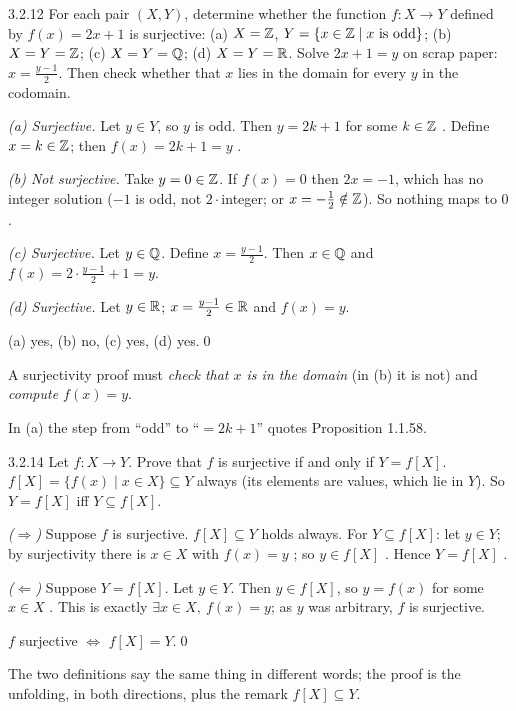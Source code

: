 \begin{bookex}[essential]{3.2.12}
For each pair $(X,Y)$, determine whether the function $f:X\to Y$ defined by $f(x)=2x+1$ is surjective: (a) $X=\mathbb{Z}$, $Y=\{x\in\mathbb{Z}\mid x\text{ is odd}\}$; (b) $X=Y=\mathbb{Z}$; (c) $X=Y=\mathbb{Q}$; (d) $X=Y=\mathbb{R}$.
\solution
\plan Solve $2x+1=y$ on scrap paper: $x=\frac{y-1}2$. Then check whether that $x$ lies in the domain for every $y$ in the codomain.
\begin{steps}
\item \emph{(a) Surjective.} Let $y\in Y$, so $y$ is odd. Then $y=2k+1$ for some $k\in\mathbb{Z}$ . Define $x=k\in\mathbb{Z}$; then $f(x)=2k+1=y$ .
\item \emph{(b) Not surjective.} Take $y=0\in\mathbb{Z}$. If $f(x)=0$ then $2x=-1$, which has no integer solution ($-1$ is odd, not $2\cdot$integer; or $x=-\frac12\notin\mathbb{Z}$). So nothing maps to $0$.
\item \emph{(c) Surjective.} Let $y\in\mathbb{Q}$. Define $x=\frac{y-1}2$. Then $x\in\mathbb{Q}$  and $f(x)=2\cdot\frac{y-1}2+1=y$.
\item \emph{(d) Surjective.} Let $y\in\mathbb{R}$; $x=\frac{y-1}2\in\mathbb{R}$ and $f(x)=y$.
\end{steps}
\conclusion (a) yes, (b) no, (c) yes, (d) yes.\qed
\begin{compare}
\item A surjectivity proof must \emph{check that $x$ is in the domain} (in (b) it is not) and \emph{compute $f(x)=y$}.
\item In (a) the step from ``odd'' to ``$=2k+1$'' quotes Proposition 1.1.58.
\end{compare}
\end{bookex}

\begin{bookex}[essential]{3.2.14}
Let $f:X\to Y$. Prove that $f$ is surjective if and only if $Y=f[X]$.
\solution
\given $f[X]=\{f(x)\mid x\in X\}\subseteq Y$ always (its elements are values, which lie in $Y$). So $Y=f[X]$ iff $Y\subseteq f[X]$.
\begin{steps}
\item \emph{($\Rightarrow$)} Suppose $f$ is surjective. $f[X]\subseteq Y$ holds always. For $Y\subseteq f[X]$: let $y\in Y$; by surjectivity there is $x\in X$ with $f(x)=y$ ; so $y\in f[X]$ . Hence $Y=f[X]$ .
\item \emph{($\Leftarrow$)} Suppose $Y=f[X]$. Let $y\in Y$. Then $y\in f[X]$, so $y=f(x)$ for some $x\in X$ . This is exactly $\exists x\in X,\ f(x)=y$; as $y$ was arbitrary, $f$ is surjective.
\end{steps}
\conclusion $f$ surjective $\Leftrightarrow$ $f[X]=Y$.\qed
\begin{compare}
\item The two definitions say the same thing in different words; the proof is the unfolding, in both directions, plus the remark $f[X]\subseteq Y$.
\end{compare}
\end{bookex}

